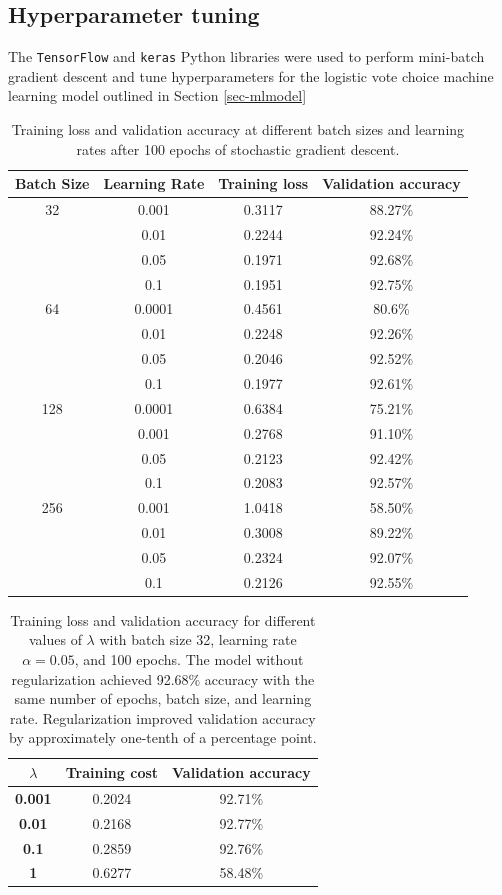 \documentclass[letter]{article}
\begin{document}
\subsection{Hyperparameter tuning}
The \texttt{TensorFlow} and \texttt{keras} Python libraries were used to perform mini-batch gradient descent and tune hyperparameters for the logistic vote choice machine learning model outlined in Section \ref{sec-mlmodel}
\begin{table}[H]
\centering
\begin{tabular}{cccc}
\midrule
\textbf{Batch Size} & \textbf{Learning Rate} & \textbf{Training loss} & \textbf{Validation accuracy} \\
\midrule
32 & 0.001 & 0.3117 & 88.27\% \\
& 0.01 & 0.2244 & 92.24\% \\
& 0.05 & 0.1971 & 92.68\% \\
& 0.1 & 0.1951 & 92.75\% \\
\hline
64 & 0.0001 & 0.4561 &  80.6\% \\
& 0.01 & 0.2248 & 92.26\% \\
& 0.05 & 0.2046 & 92.52\% \\
& 0.1 & 0.1977 & 92.61\% \\
\hline
128 & 0.0001 & 0.6384 & 75.21\% \\
& 0.001 & 0.2768 & 91.10\% \\
& 0.05 & 0.2123 & 92.42\% \\
& 0.1 & 0.2083 & 92.57\% \\
\hline
256 & 0.001 & 1.0418 & 58.50\% \\
& 0.01 & 0.3008 & 89.22\% \\
& 0.05 & 0.2324 & 92.07\% \\
& 0.1 & 0.2126 & 92.55\% \\
\end{tabular}
\caption{Training loss and validation accuracy at different batch sizes and learning rates after 100 epochs of stochastic gradient descent.}
\end{table}
\begin{table}[H]
\centering
\begin{tabular}{ccc} \midrule
    \textbf{$\lambda$} & \textbf{Training cost} & \textbf{Validation accuracy} \\
    \midrule
     \textbf{0.001} & 0.2024 & 92.71\% \\ \hline
     \textbf{0.01} & 0.2168 & 92.77\% \\ \hline
     \textbf{0.1} &  0.2859 & 92.76\% \\ \hline
     \textbf{1} & 0.6277 &  58.48\% \\ \hline
\end{tabular} \\
\caption{Training loss and validation accuracy for different values of $\lambda$ with batch size 32, learning rate $\alpha=0.05$, and 100 epochs. The model without regularization achieved 92.68\% accuracy with the same number of epochs, batch size, and learning rate. Regularization improved validation accuracy by approximately one-tenth of a percentage point.}
\end{table}
\end{document}
